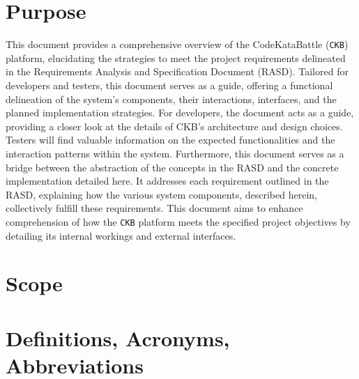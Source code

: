 \section{Purpose}
\label{sec:purpose}
This document provides a comprehensive overview of the CodeKataBattle (\verb|CKB|) platform, elucidating the strategies to meet the project requirements delineated in the Requirements Analysis and Specification Document (RASD). 
Tailored for developers and testers, this document serves as a guide, offering a functional delineation of the system's components, their interactions, interfaces, and the planned implementation strategies.
For developers, the document acts as a guide, providing a closer look at the details of CKB's architecture and design choices.
Testers will find valuable information on the expected functionalities and the interaction patterns within the system.
Furthermore, this document serves as a bridge between the abstraction of the concepts in the RASD and the concrete implementation detailed here. 
It addresses each requirement outlined in the RASD, explaining how the various system components, described herein, collectively fulfill these requirements. 
This document aims to enhance comprehension of how the \verb|CKB| platform meets the specified project objectives by detailing its internal workings and external interfaces.

\section{Scope}
\label{sec:scope}


\section{Definitions, Acronyms, Abbreviations}
\label{sec:definitions_acronyms_abbreviations}

